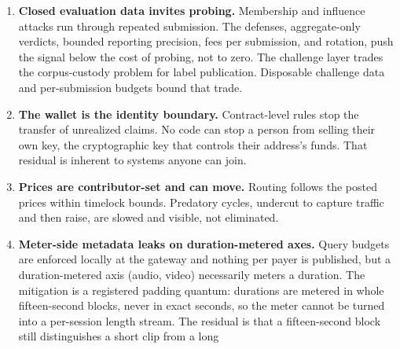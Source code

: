 \documentclass[11pt]{article}
\begin{document}
\begin{enumerate}
          The beacon output for the round closes after the declaration, so
          no payer can predict the draw when choosing a session; forcing
          a preferred arm means re-declaring across rounds, each attempt
          costing a declaration fee. Measured on the anchor-seeded form of
          the seed, where the anchor is public within an epoch, forcing
          the least-favoured of three arms took $3.1$ declarations on
          average. No host can do this, because no host owns another
          party's session identifiers and the seed carries no arm field.
          The residual is small: each attempt costs a declaration fee, and
          a payer can already express arm preference openly through
          best-quality mode, so grinding buys a preference it could have
          asked for.
    \item \textbf{Closed evaluation data invites probing.} Membership and
          influence attacks run through repeated submission. The defenses,
          aggregate-only verdicts, bounded reporting precision, fees per
          submission, and rotation, push the signal below the cost of
          probing, not to zero. The challenge layer trades the
          corpus-custody problem for label publication. Disposable
          challenge data and per-submission budgets bound that trade.
    \item \textbf{The wallet is the identity boundary.} Contract-level rules
          stop the transfer of unrealized claims. No code can stop a person
          from selling their own key, the cryptographic key that controls
          their address's funds. That residual is inherent to systems anyone
          can join.
    \item \textbf{Prices are contributor-set and can move.} Routing follows
          the posted prices within timelock bounds. Predatory cycles, undercut to capture traffic and then raise,
          are slowed and visible, not eliminated.
    \item \textbf{Meter-side metadata leaks on duration-metered axes.}
          Query budgets are enforced locally at the gateway and nothing per
          payer is published, but a duration-metered axis (audio, video)
          necessarily meters a duration. The mitigation is a registered
          padding quantum: durations are metered in whole fifteen-second
          blocks, never in exact seconds, so the meter cannot be turned
          into a per-session length stream. The residual is that a
          fifteen-second block still distinguishes a short clip from a long

\end{enumerate}
\end{document}
